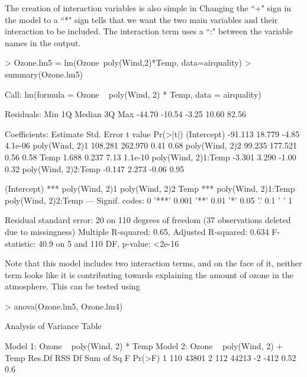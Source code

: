 The creation of interaction variables is also simple in \R{} Changing the ``+" sign in the model to a ``*" sign tells \R{} that we want the two main variables and their interaction to be included. The interaction term uses a ``:" between the variable names in the output.
\begin{Schunk}
\begin{Sinput}
> Ozone.lm5 = lm(Ozone~poly(Wind,2)*Temp, data=airquality)
> summary(Ozone.lm5)
\end{Sinput}
\begin{Soutput}

Call:
lm(formula = Ozone ~ poly(Wind, 2) * Temp, data = airquality)

Residuals:
   Min     1Q Median     3Q    Max 
-44.70 -10.54  -3.25  10.60  82.56 

Coefficients:
                    Estimate Std. Error t value Pr(>|t|)
(Intercept)          -91.113     18.779   -4.85  4.1e-06
poly(Wind, 2)1       108.281    262.970    0.41     0.68
poly(Wind, 2)2        99.235    177.521    0.56     0.58
Temp                   1.688      0.237    7.13  1.1e-10
poly(Wind, 2)1:Temp   -3.301      3.290   -1.00     0.32
poly(Wind, 2)2:Temp   -0.147      2.273   -0.06     0.95
                       
(Intercept)         ***
poly(Wind, 2)1         
poly(Wind, 2)2         
Temp                ***
poly(Wind, 2)1:Temp    
poly(Wind, 2)2:Temp    
---
Signif. codes:  
0 '***' 0.001 '**' 0.01 '*' 0.05 '.' 0.1 ' ' 1

Residual standard error: 20 on 110 degrees of freedom
  (37 observations deleted due to missingness)
Multiple R-squared:  0.65,	Adjusted R-squared:  0.634 
F-statistic: 40.9 on 5 and 110 DF,  p-value: <2e-16
\end{Soutput}
\end{Schunk}
Note that this model includes two interaction terms, and on the face of it, neither term looks like it is contributing towards explaining the amount of ozone in the atmosphere. This can be tested using
\begin{Schunk}
\begin{Sinput}
> anova(Ozone.lm5, Ozone.lm4)
\end{Sinput}
\begin{Soutput}
Analysis of Variance Table

Model 1: Ozone ~ poly(Wind, 2) * Temp
Model 2: Ozone ~ poly(Wind, 2) + Temp
  Res.Df   RSS Df Sum of Sq    F Pr(>F)
1    110 43801                         
2    112 44213 -2      -412 0.52    0.6
\end{Soutput}
\end{Schunk}

